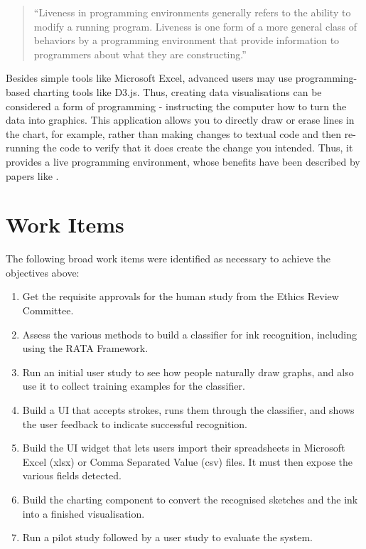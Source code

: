 	\begin{quote}
	 ``Liveness in programming environments generally refers to the ability to modify a running program. Liveness is one form of a more general class of behaviors by a programming environment that provide information to programmers about what they are constructing.''
	 \end{quote} 
	\begin{flushright}
	 \citep{tanimoto_perspective_2013}
	\end{flushright}
	
	Besides simple tools like Microsoft Excel, advanced users may use programming-based charting tools like D3.js. Thus, creating data visualisations can be considered a form of programming - instructing the computer how to turn the data into graphics. This application allows you to directly draw or erase lines in the chart, for example, rather than making changes to textual code and then re-running the code to verify that it does create the change you intended. Thus, it provides a live programming environment, whose benefits have been described by papers like \cite{tanimoto_perspective_2013}.	
	
	\section{Work Items}

	The following broad work items were identified as necessary to achieve the objectives above:
	\begin{enumerate}
		\item Get the requisite approvals for the human study from the Ethics Review Committee.
		\item Assess the various methods to build a classifier for ink recognition, including using the RATA Framework.
		\item Run an initial user study to  see how people naturally draw graphs, and also use it to collect training examples for the classifier.
		\item Build a UI that accepts strokes, runs them through the classifier, and shows the user feedback to indicate successful recognition.
		\item Build the UI widget that lets users import their spreadsheets in Microsoft Excel (xlsx) or Comma Separated Value (csv) files. It must then expose the various fields detected.
		\item Build the charting component to convert the recognised sketches and the ink into a finished visualisation.
		\item Run a pilot study followed by a user study to evaluate the system.
	\end{enumerate}	
	
